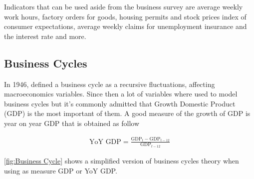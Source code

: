 \documentclass[12pt,a4paper,oneside]{book}
\begin{document}
Indicators that can be used aside from the business survey are average weekly work hours, factory orders for goods, housing permits and stock prices index of consumer expectations, average weekly claims for unemployment insurance and the interest rate and more.


\subsection{Business Cycles}
\label{sec:Business Cycles}

In 1946, \citeauthor{mitchell_measuring_1946} defined a business cycle as a recursive fluctuations, affecting macroeconomics variables. Since then a lot of variables where used to model business cycles but it's commonly admitted that Growth Domestic Product (GDP) is the most important of them. 
A good measure of the growth of GDP is year on year GDP that is obtained as follow

\begin{eqnarray}
   \mbox{YoY GDP} = \frac{\mbox{GDP}_t - \mbox{GDP}_{t-12}}{\mbox{GDP}_{t-12}}      \label{eq:YoY GDP}
\end{eqnarray}


\autoref{fig:Business Cycle} shows a simplified version of business cycles theory when using as measure GDP or YoY GDP.
\end{document}
